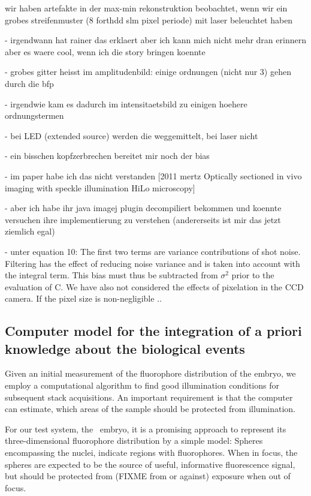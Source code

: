 {\color{red} wir haben artefakte in der max-min rekonstruktion
  beobachtet, wenn wir ein grobes streifenmuster (8 forthdd slm pixel
  periode) mit laser beleuchtet haben

     - irgendwann hat rainer das erklaert aber ich kann mich nicht
       mehr dran erinnern aber es waere cool, wenn ich die story
       bringen koennte
     
- grobes gitter heisst im amplitudenbild: einige ordnungen (nicht
       nur 3) gehen durch die bfp

     - irgendwie kam es dadurch im intensitaetsbild zu einigen hoehere
       ordnungstermen

     - bei LED (extended source) werden die weggemittelt, bei laser
       nicht

       - ein bisschen kopfzerbrechen bereitet mir noch der bias 

       - im paper habe ich das nicht verstanden [2011 mertz Optically
       sectioned in vivo imaging with speckle illumination HiLo
       microscopy]

       - aber ich habe ihr java imagej plugin decompiliert bekommen
       und koennte versuchen ihre implementierung zu verstehen
       (andererseits ist mir das jetzt ziemlich egal)

       - unter equation 10: The first two terms are variance
       contributions of shot noise. Filtering has the effect of
       reducing noise variance and is taken into account with the
       integral term. This bias must thus be subtracted from
       $\sigma^2$ prior to the evaluation of C. We have also not
       considered the effects of pixelation in the CCD camera. If the
       pixel size is non-negligible ..  }

\subsection{Computer model for the integration of a priori knowledge
  about the biological events}
Given an initial measurement of the fluorophore distribution of the
embryo, we employ a computational algorithm to find good illumination
conditions for subsequent stack acquisitions. An important
requirement is that the computer can estimate, which areas of the
sample should be protected from illumination. 

For our test system, the \celegans\ embryo, it is a promising approach
to represent its three-dimensional fluorophore distribution by a simple
model: Spheres encompassing the nuclei, indicate regions with fluorophores. When in focus, the
spheres are expected to be the source of useful, informative fluorescence signal,
but should be protected from (FIXME from or against) exposure when out of
focus.

